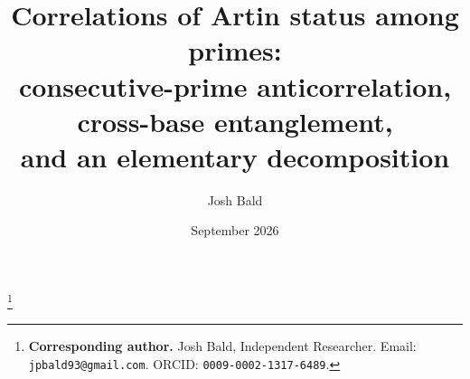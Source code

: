 \title[Correlations of Artin status among primes]{Correlations of Artin status among primes:\\ consecutive-prime anticorrelation, cross-base entanglement,\\ and an elementary decomposition}

\author{Josh Bald}
\address{Ontario, Canada}
\thanks{\textbf{Corresponding author.} Josh Bald, Independent Researcher.
	Email: \texttt{jpbald93@gmail.com}. ORCID: \texttt{0009-0002-1317-6489}.}


\date{September 2026}

